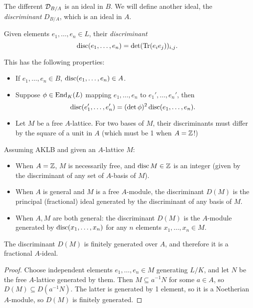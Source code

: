 \documentclass[11pt]{amsart}
\begin{document}
The different $\mathcal{D}_{B/A}$ is an ideal in $B$. We will define another ideal, the \emph{discriminant} $D_{B/A}$, which is an ideal in $A$. 

\begin{defn}
Given elements $e_1,\dots,e_n\in L$, their \emph{discriminant}
\[\operatorname{disc}(e_1,\dots,e_n) = \det (\operatorname{Tr}(e_ie_j))_{i,j}.\]
\end{defn}

This has the following properties:
\begin{itemize}
    \item If $e_1,\dots,e_n\in B$, $\operatorname{disc}(e_1,\dots,e_n)\in A$.
    \item Suppose $\phi\in \operatorname{End}_K(L)$ mapping $e_1,\dots,e_n$ to $e_1',\dots,e_n'$, then 
    \[\operatorname{disc}(e_1',\dots,e_n') = (\det\phi)^2\operatorname{disc}(e_1,\dots,e_n).\]
    \item Let $M$ be a free $A$-lattice. For two bases of $M$, their discriminants must differ by the square of a unit in $A$ (which must be 1 when $A=\mathbb{Z}$!)
\end{itemize}

\begin{defn}
Assuming AKLB and given an $A$-lattice $M$:
\begin{itemize}
    \item When $A=\mathbb{Z}$, $M$ is necessarily free, and $\operatorname{disc} M \in \mathbb{Z}$ is an integer (given by the discriminant of any set of $A$-basis of $M$).
    \item When $A$ is general and $M$ is a free $A$-module, the discriminant $D(M)$ is the principal (fractional) ideal generated by the discriminant of any basis of $M$.
    \item When $A,M$ are both general: the discriminant $D(M)$ is the $A$-module generated by $\operatorname{disc}(x_1,\dots,x_n)$ for any $n$ elements $x_1,\dots,x_n\in M$.
\end{itemize}
\end{defn}

\begin{prop}
The discriminant $D(M)$ is finitely generated over $A$, and therefore it is a fractional $A$-ideal.
\end{prop}

\begin{proof}
Choose independent elements $e_1,\dots,e_n\in M$ generating $L/K$, and let $N$ be the free $A$-lattice generated by them. Then $M\subseteq a^{-1}N$ for some $a\in A$, so $D(M)\subseteq D(a^{-1}N)$. The latter is generated by 1 element, so it is a Noetherian $A$-module, so $D(M)$ is finitely generated.
\end{proof}
\end{document}
